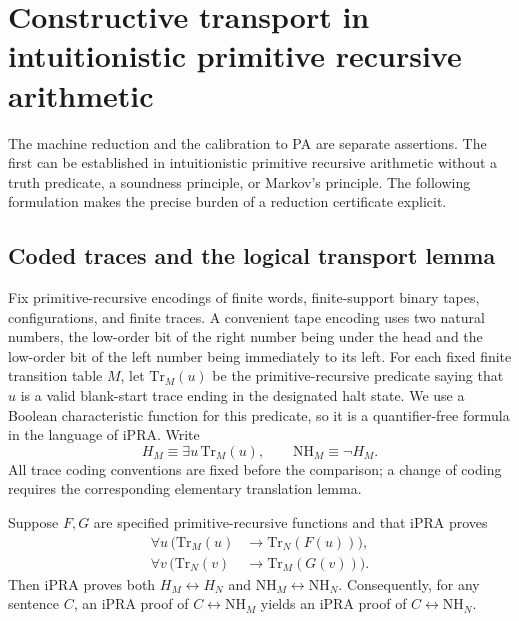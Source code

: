 \section{Constructive transport in intuitionistic primitive recursive arithmetic}
\label{sec:ipra-transport}

The machine reduction and the calibration to PA are separate assertions.
The first can be established in intuitionistic primitive recursive arithmetic
without a truth predicate, a soundness principle, or Markov's principle.
The following formulation makes the precise burden of a reduction certificate
explicit.

\subsection{Coded traces and the logical transport lemma}

Fix primitive-recursive encodings of finite words, finite-support binary
tapes, configurations, and finite traces. A convenient tape encoding uses
two natural numbers, the low-order bit of the right number being under the
head and the low-order bit of the left number being immediately to its left.
For each fixed finite transition table $M$, let $\mathrm{Tr}_M(u)$ be the
primitive-recursive predicate saying that $u$ is a valid blank-start trace
ending in the designated halt state. We use a Boolean characteristic
function for this predicate, so it is a quantifier-free formula in the
language of iPRA. Write
\[
 H_M\equiv\exists u\,\mathrm{Tr}_M(u),\qquad
 \mathrm{NH}_M\equiv\neg H_M.
\]
All trace coding conventions are fixed before the comparison; a change of
coding requires the corresponding elementary translation lemma.

\begin{theorem}
Suppose $F,G$ are specified primitive-recursive functions and that iPRA proves
\begin{align*}
 \forall u\,(\mathrm{Tr}_M(u)&\longrightarrow\mathrm{Tr}_N(F(u))),\\
 \forall v\,(\mathrm{Tr}_N(v)&\longrightarrow\mathrm{Tr}_M(G(v))).
\end{align*}
Then iPRA proves both $H_M\leftrightarrow H_N$ and
$\mathrm{NH}_M\leftrightarrow\mathrm{NH}_N$. Consequently, for any sentence
$C$, an iPRA proof of $C\leftrightarrow\mathrm{NH}_M$ yields an iPRA proof
of $C\leftrightarrow\mathrm{NH}_N$.
\end{theorem}

